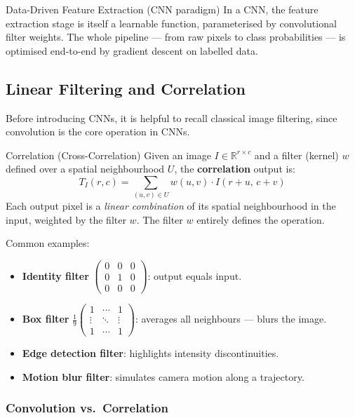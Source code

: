 \documentclass[11pt,a4paper]{article}
\newcommand{\term}[1]{\textcolor{DefGreen}{\textbf{#1}}\index{#1}}
\begin{document}
\begin{defbox}{Data-Driven Feature Extraction (CNN paradigm)}
In a CNN, the feature extraction stage is itself a learnable function, parameterised by convolutional filter weights. The whole pipeline — from raw pixels to class probabilities — is optimised end-to-end by gradient descent on labelled data.
\end{defbox}

\subsection{Linear Filtering and Correlation}
\label{sec:filtering}

Before introducing CNNs, it is helpful to recall classical image filtering, since convolution is the core operation in CNNs.

\begin{defbox}{Correlation (Cross-Correlation)}
Given an image $I \in \mathbb{R}^{r \times c}$ and a filter (kernel) $w$ defined over a spatial neighbourhood $U$, the \term{correlation} output is:
\[
T_I(r,c) = \sum_{(u,v)\in U} w(u,v)\cdot I(r+u,\, c+v)
\]
Each output pixel is a \emph{linear combination} of its spatial neighbourhood in the input, weighted by the filter $w$. The filter $w$ entirely defines the operation.
\end{defbox}

Common examples:
\begin{itemize}
  \item \textbf{Identity filter} $\begin{pmatrix}0&0&0\\0&1&0\\0&0&0\end{pmatrix}$: output equals input.
  \item \textbf{Box filter} $\frac{1}{9}\begin{pmatrix}1&\cdots&1\\\vdots&\ddots&\vdots\\1&\cdots&1\end{pmatrix}$: averages all neighbours — blurs the image.
  \item \textbf{Edge detection filter}: highlights intensity discontinuities.
  \item \textbf{Motion blur filter}: simulates camera motion along a trajectory.
\end{itemize}

\subsubsection{Convolution vs.\ Correlation}
\end{document}
